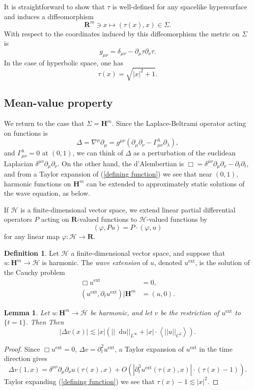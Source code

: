 \documentclass[reqno,12pt,letterpaper]{amsart}
\newcommand{\RR}{\mathbf{R}}
\newcommand{\Hyp}{\mathbf H}
\newcommand{\ext}{\mathrm{ext}}
\newcommand*\dif{\mathop{}\!\mathrm{d}}
\newcommand{\Hilb}{\mathcal H}
\newcommand{\dfn}[1]{\emph{#1}\index{#1}}
\def\Japan#1{\left \langle #1 \right \rangle}
\newtheorem{lemma}[theorem]{Lemma}
\theoremstyle{definition}
\newtheorem{definition}[theorem]{Definition}
\numberwithin{equation}{section}
\begin{document}
It is straightforward to show that $\tau$ is well-defined for any spacelike hypersurface and induces a diffeomorphism
$$\RR^m \ni x \mapsto (\tau(x), x) \in \Sigma.$$
With respect to the coordinates induced by this diffeomorphism the metric on $\Sigma$ is
\begin{equation}\label{spacelike metric}
g_{\mu\nu} = \delta_{\mu\nu} - \partial_\mu \tau \partial_\nu \tau.
\end{equation}
In the case of hyperbolic space, one has 
\begin{equation}\label{defining function}
\tau(x) = \sqrt{|x|^2 + 1}.
\end{equation}

\subsection{Mean-value property}
We return to the case that $\Sigma = \Hyp^m$. Since the Laplace-Beltrami operator acting on functions is
$$\Delta = \nabla^\mu \partial_\mu = g^{\mu \nu} (\partial_\mu \partial_\nu - \Gamma_{\mu \nu}^\lambda \partial_\lambda),$$
and $\Gamma_{\mu \nu}^\lambda = 0$ at $(0, 1)$, we can think of $\Delta$ as a perturbation of the euclidean Laplacian $\delta^{\mu\nu} \partial_\mu \partial_\nu$.
On the other hand, the d'Alembertian is $\Box = \delta^{\mu\nu} \partial_\mu \partial_\nu - \partial_t \partial_t$, and from a Taylor expansion of (\ref{defining function}) we see that near $(0, 1)$, harmonic functions on $\Hyp^m$ can be extended to approximately static solutions of the wave equation, as below.

If $\Hilb$ is a finite-dimensional vector space, we extend linear partial differential operators $P$ acting on $\RR$-valued functions to $\Hilb$-valued functions by 
$$(\varphi, Pu) = P \cdot (\varphi, u)$$
for any linear map $\varphi: \Hilb \to \RR$.

\begin{definition}
Let $\Hilb$ a finite-dimensional vector space, and suppose that $u: \Hyp^m \to \Hilb$ is harmonic.
The \dfn{wave extension} of $u$, denoted $u^\ext$, is the solution of the Cauchy problem
\begin{align*}
\Box u^\ext &= 0, \\
(u^\ext, \partial_t u^\ext)|\Hyp^m &= (u, 0).
\end{align*}
\end{definition}

\begin{lemma}
Let $u: \Hyp^m \to \Hilb$ be harmonic, and let $v$ be the restriction of $u^\ext$ to $\{t = 1\}$. Then
Then 
$$|\Delta v(x)| \lesssim |x|(||\dif u||_{L^\infty} + |x| \cdot \Japan{||u||_{C^2}}).$$
\end{lemma}
\begin{proof}
Since $\Box u^\ext = 0$, $\Delta v = \partial_t^2 u^\ext$, a Taylor expansion of $u^\ext$ in the time direction gives 
$$\Delta v(1, x) = \delta^{\mu \nu} \partial_\mu \partial_\nu u(\tau(x), x) + O(|\partial_t^3 u^\ext(\tau(x), x)| \cdot (\tau(x) - 1)).$$
Taylor expanding (\ref{defining function}) we see that $\tau(x) - 1 \lesssim |x|^2$.

\end{proof}
\end{document}
